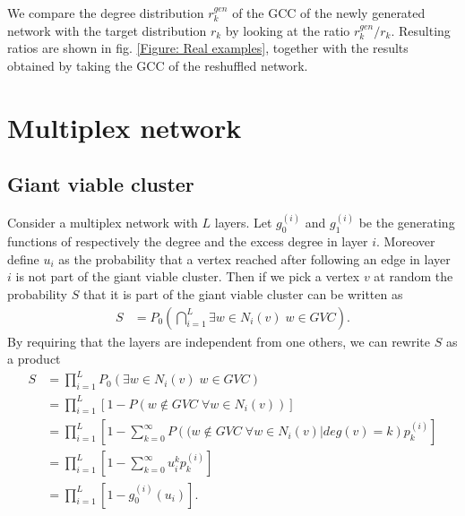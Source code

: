 \documentclass[
11pt, %
english, %
singlespacing, %
liststotoc, %
headsepline, %
]{MastersDoctoralThesis} %
\begin{document}
We compare the degree distribution $r^{gen}_k$ of the GCC of the newly generated network with the target distribution $r_k$ by looking at the ratio $r^{gen}_k / r_k$. Resulting ratios are shown in fig. \ref{Figure: Real examples}, together with the results obtained by taking the GCC of the reshuffled network.


\chapter{Multiplex network}
\label{Section: Multiplex networks}

\section{Giant viable cluster}

Consider a multiplex network with $L$ layers. Let $g_0^{(i)}$ and $g_1^{(i)}$ be the generating functions of respectively the degree and the excess degree in layer $i$. Moreover define $u_i$ as the probability that a vertex reached after following an edge in layer $i$ is not part of the giant viable cluster. Then if we pick a vertex $v$ at random the probability $S$ that it is part of the giant viable cluster can be written as
\begin{align}
	S &= P_0\left(\bigcap_{i = 1}^{L} \exists w \in N_i(v) \; w \in GVC \right).
\end{align}
By requiring that the layers are independent from one others, we can rewrite $S$ as a product
\begin{align}
	S &= \prod_{i = 1}^{L}  P_0\left(\exists w \in N_i(v) \; w \in GVC\right) \\
		&=\prod_{i = 1}^{L}  \left[1 - P\left(w \notin GVC \; \forall w \in N_i(v)\right) \right] \\
		&=\prod_{i = 1}^{L}  \left[1 - \sum_{k = 0}^{\infty} P\left((w \notin GVC \; \forall w \in N_i(v) | deg(v) = k \right) p^{(i)}_k \right] \\
		&=\prod_{i = 1}^{L}  \left[1 - \sum_{k = 0}^{\infty} u_i^k p^{(i)}_k \right] \\
		&=\prod_{i = 1}^{L}  \left[1 - g_0^{(i)}(u_i) \right].\label{Multiplex GCC size final}
\end{align}
\end{document}
